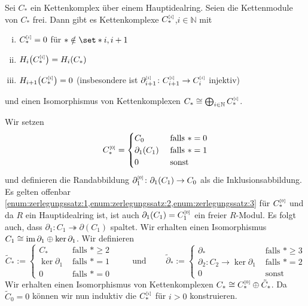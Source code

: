 \begin{satz}[{name={Zerlegungssatz}},label=zerlegungssatz]
	Sei $C_*$ ein Kettenkomplex über einem Hauptidealring.
	Seien die Kettenmodule von $C_*$ frei.
	Dann gibt es Kettenkomplexe $C_*^{\scriptscriptstyle[i]}$,$i \in \mathbb{N}$ mit 
	\begin{enumerate}[(i)]
		\item \label{enum:zerlegungssatz:1}$C_*^{\scriptscriptstyle[i]}=0$ für $* \notin \set*{i,i+1}$
		\item \label{enum:zerlegungssatz:2}$H_i \enbrace*{C_*^\ssbbrace{i}} = H_i(C_*)$
		\item \label{enum:zerlegungssatz:3}$H_{i+1} \enbrace*{C_*^\ssbbrace{i}}=0$ (insbesondere ist $\partial_{i+1}^{\scriptscriptstyle[i]} \colon C^{\scriptscriptstyle[i]}_{i+1} \to C_i^{\scriptscriptstyle[i]}$ injektiv)
	\end{enumerate}
	und einen Isomorphismus von Kettenkomplexen $C_* \cong \bigoplus_{i \in \mathbb{N}} C_*^{\scriptscriptstyle[i]}$.
\end{satz}
\begin{beweis}
	Wir setzen 
	\[
		C_*^{\scriptscriptstyle[0]} = \begin{cases}
			C_0 &\text{ falls }*=0\\
			\partial_1(C_1) &\text{ falls }*=1 \\
			0 &\text{ sonst} 
		\end{cases}
	\]
	und definieren die Randabbildung $\partial_1^{\scriptscriptstyle[0]} \colon \partial_1(C_1) \to C_0$ als die Inklusionsabbildung.
	Es gelten offenbar \cref{enum:zerlegungssatz:1,enum:zerlegungssatz:2,enum:zerlegungssatz:3} für $C_*^{\scriptscriptstyle[0]}$ und da $R$ ein Hauptidealring ist, ist auch $\partial_1(C_1)= C_1^{\scriptscriptstyle[0]}$ ein freier $R$-Modul.
	Es folgt auch, dass $\partial_1 \colon C_1 \twoheadrightarrow \partial(C_1)$ spaltet.
	Wir erhalten einen Isomorphismus $C_1 \cong \operatorname{im} \partial_1 \oplus \ker \partial_1$.
	Wir definieren 
	\[
		\tilde{C}_* := \begin{cases}
			C_* &\text{ falls }*\ge 2\\
			\ker \partial_1 &\text{ falls } *=1 \\
			0 &\text{ falls } *=0 
		\end{cases}
		\qquad \text{ und } \qquad 
		\tilde{\partial}_* := \begin{cases}
			\partial_* &\text{ falls }*\ge 3\\
			\partial_2 \colon C_2 \to \ker \partial_1 &\text{ falls } *=2 \\
			0 &\text{ sonst} 
		\end{cases} 
	\]
	Wir erhalten einen Isomorphismus von Kettenkomplexen $C_* \cong C_*^{\scriptscriptstyle[0]} \oplus \tilde{C}_*$.
	Da $\tilde{C}_0=0$ können wir nun induktiv die $C_*^{\scriptscriptstyle[i]}$ für $i >0$ konstruieren.
\end{beweis}

